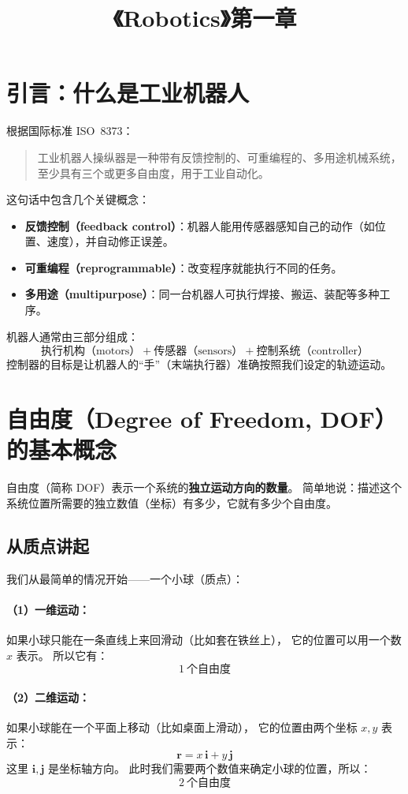\documentclass[12pt,a4paper]{article}
\title{《Robotics》第一章}
\author{}
\date{}
\begin{document}
\maketitle

\section{引言：什么是工业机器人}
根据国际标准 ISO~8373：
\begin{quote}
工业机器人操纵器是一种带有反馈控制的、可重编程的、多用途机械系统，至少具有三个或更多自由度，用于工业自动化。
\end{quote}

\noindent
这句话中包含几个关键概念：
\begin{itemize}
  \item \textbf{反馈控制（feedback control）}：机器人能用传感器感知自己的动作（如位置、速度），并自动修正误差。
  \item \textbf{可重编程（reprogrammable）}：改变程序就能执行不同的任务。
  \item \textbf{多用途（multipurpose）}：同一台机器人可执行焊接、搬运、装配等多种工序。
\end{itemize}

机器人通常由三部分组成：
\[
\text{执行机构（motors）} + \text{传感器（sensors）} + \text{控制系统（controller）}
\]
控制器的目标是让机器人的“手”（末端执行器）准确按照我们设定的轨迹运动。

\section{自由度（Degree of Freedom, DOF）的基本概念}
自由度（简称 DOF）表示一个系统的\textbf{独立运动方向的数量}。  
简单地说：描述这个系统位置所需要的独立数值（坐标）有多少，它就有多少个自由度。

\subsection{从质点讲起}
我们从最简单的情况开始——一个小球（质点）：

\paragraph{（1）一维运动：}
如果小球只能在一条直线上来回滑动（比如套在铁丝上），
它的位置可以用一个数 \(x\) 表示。  
所以它有：
\[
\boxed{1\ \text{个自由度}}
\]

\paragraph{（2）二维运动：}
如果小球能在一个平面上移动（比如桌面上滑动），
它的位置由两个坐标 \(x, y\) 表示：
\[
\boldsymbol{r} = x\,\boldsymbol{i} + y\,\boldsymbol{j}
\]
这里 \(\boldsymbol{i},\boldsymbol{j}\) 是坐标轴方向。  
此时我们需要两个数值来确定小球的位置，所以：
\[
\boxed{2\ \text{个自由度}}
\]
\end{document}
